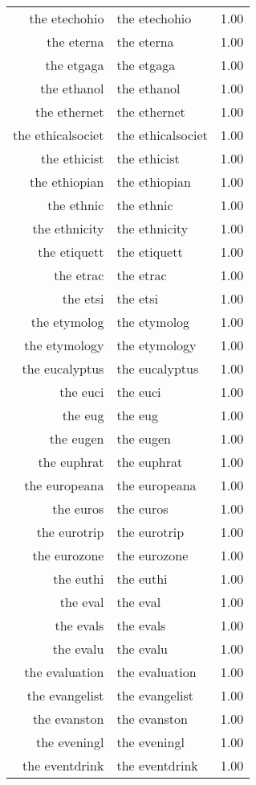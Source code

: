 \begin{table}[ht]
\begin{tabular}{rlr}
  the etechohio & the etechohio & 1.00 \\ 
  the eterna & the eterna & 1.00 \\ 
  the etgaga & the etgaga & 1.00 \\ 
  the ethanol & the ethanol & 1.00 \\ 
  the ethernet & the ethernet & 1.00 \\ 
  the ethicalsociet & the ethicalsociet & 1.00 \\ 
  the ethicist & the ethicist & 1.00 \\ 
  the ethiopian & the ethiopian & 1.00 \\ 
  the ethnic & the ethnic & 1.00 \\ 
  the ethnicity & the ethnicity & 1.00 \\ 
  the etiquett & the etiquett & 1.00 \\ 
  the etrac & the etrac & 1.00 \\ 
  the etsi & the etsi & 1.00 \\ 
  the etymolog & the etymolog & 1.00 \\ 
  the etymology & the etymology & 1.00 \\ 
  the eucalyptus & the eucalyptus & 1.00 \\ 
  the euci & the euci & 1.00 \\ 
  the eug & the eug & 1.00 \\ 
  the eugen & the eugen & 1.00 \\ 
  the euphrat & the euphrat & 1.00 \\ 
  the europeana & the europeana & 1.00 \\ 
  the euros & the euros & 1.00 \\ 
  the eurotrip & the eurotrip & 1.00 \\ 
  the eurozone & the eurozone & 1.00 \\ 
  the euthi & the euthi & 1.00 \\ 
  the eval & the eval & 1.00 \\ 
  the evals & the evals & 1.00 \\ 
  the evalu & the evalu & 1.00 \\ 
  the evaluation & the evaluation & 1.00 \\ 
  the evangelist & the evangelist & 1.00 \\ 
  the evanston & the evanston & 1.00 \\ 
  the eveningl & the eveningl & 1.00 \\ 
  the eventdrink & the eventdrink & 1.00 \\ 

\end{tabular}
\end{table}
